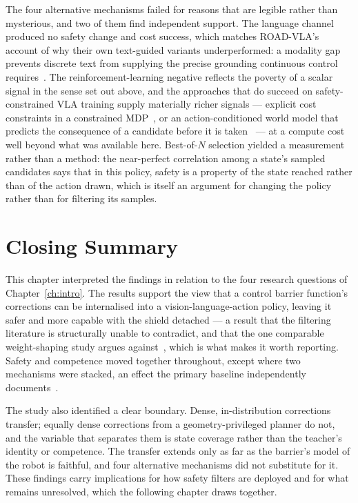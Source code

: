 \documentclass[a4paper,11pt]{report}
\begin{document}
The four alternative mechanisms failed for reasons that are legible rather than mysterious, and two
of them find independent support. The language channel produced no safety change and cost success,
which matches ROAD-VLA's account of why their own text-guided variants underperformed: a modality
gap prevents discrete text from supplying the precise grounding continuous control
requires~\cite{wang2026roadvla}. The reinforcement-learning negative reflects the poverty of a
scalar signal in the sense set out above, and the approaches that do succeed on safety-constrained
VLA training supply materially richer signals --- explicit cost constraints in a constrained
MDP~\cite{safevla}, or an action-conditioned world model that predicts the consequence of a
candidate before it is taken~\cite{safedojo} --- at a compute cost well beyond what was available
here. Best-of-$N$ selection yielded a measurement rather than a method: the near-perfect
correlation among a state's sampled candidates says that in this policy, safety is a property of
the state reached rather than of the action drawn, which is itself an argument for changing the
policy rather than for filtering its samples.

\section{Closing Summary}\label{sec:disc:summary}

This chapter interpreted the findings in relation to the four research questions of
Chapter~\ref{ch:intro}. The results support the view that a control barrier function's corrections
can be internalised into a vision-language-action policy, leaving it safer and more capable with
the shield detached --- a result that the filtering literature is structurally unable to
contradict, and that the one comparable weight-shaping study argues against~\cite{guerrier2025guardrails},
which is what makes it worth reporting. Safety and competence moved together throughout, except
where two mechanisms were stacked, an effect the primary baseline independently
documents~\cite{vlsa2026}.

The study also identified a clear boundary. Dense, in-distribution corrections transfer; equally
dense corrections from a geometry-privileged planner do not, and the variable that separates them
is state coverage rather than the teacher's identity or competence. The transfer extends only as
far as the barrier's model of the robot is faithful, and four alternative mechanisms did not
substitute for it. These findings carry implications for how safety filters are deployed and for
what remains unresolved, which the following chapter draws together.
\end{document}

